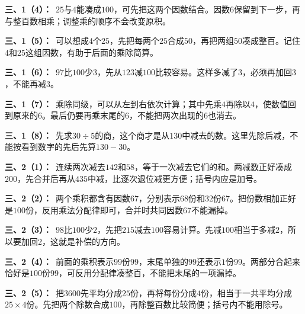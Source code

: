 \documentclass[multi=snippet,border=0pt]{standalone}
\newenvironment{snippet}[3]{\begin{minipage}{#1bp}\color{answerred}\fontsize{#2}{#3}\selectfont\raggedright}{\end{minipage}}
\begin{document}
\begin{snippet}{505}{11.5}{14}\textbf{三、1（4）：}\ \(25\)与\(4\)能凑成\(100\)，可先把这两个因数结合。因数\(6\)保留到下一步，再与整百数相乘；调整乘的顺序不会改变原积。\end{snippet}
\begin{snippet}{505}{11.5}{14}\textbf{三、1（5）：}\ 可以想成\(4\)个\(25\)，先把每两个\(25\)合成\(50\)，再把两组\(50\)凑成整百。记住\(4\)和\(25\)这组因数，有助于后面的乘除简算。\end{snippet}
\begin{snippet}{505}{11.5}{14}\textbf{三、1（6）：}\ \(97\)比\(100\)少\(3\)，先从\(123\)减\(100\)比较容易。这样多减了\(3\)，必须再加回\(3\)，不能再减\(3\)。\end{snippet}
\begin{snippet}{505}{11.5}{14}\textbf{三、1（7）：}\ 乘除同级，可以从左到右依次计算；其中先乘\(4\)再除以\(4\)，使数值回到原来的\(6\)。最后仍要再乘末尾的\(6\)，不能把两次出现的\(6\)也消去。\end{snippet}
\begin{snippet}{505}{11.5}{14}\textbf{三、1（8）：}\ 先求\(30\div5\)的商，这个商才是从\(130\)中减去的数。这里先除后减，不能按看到数字的先后先算\(130-30\)。\end{snippet}
\begin{snippet}{505}{11.5}{14}\textbf{三、2（1）：}\ 连续两次减去\(142\)和\(58\)，等于一次减去它们的和。两减数正好凑成\(200\)，先合并后再从\(435\)中减，比逐次退位减更方便；括号内应是加号。\end{snippet}
\begin{snippet}{505}{11.5}{14}\textbf{三、2（2）：}\ 两个乘积都含有因数\(67\)，分别表示\(68\)份和\(32\)份\(67\)。把份数相加正好是\(100\)份，反用乘法分配律即可，合并时共同因数\(67\)不能漏掉。\end{snippet}
\begin{snippet}{505}{11.5}{14}\textbf{三、2（3）：}\ \(98\)比\(100\)少\(2\)，先把\(215\)减去\(100\)容易计算。先减\(100\)相当于多减\(2\)，所以要加回\(2\)，这就是补偿的方向。\end{snippet}
\begin{snippet}{505}{11.5}{14}\textbf{三、2（4）：}\ 前面的乘积表示\(99\)份\(99\)，末尾单独的\(99\)还表示\(1\)份\(99\)。两部分合起来恰好是\(100\)份\(99\)，可反用分配律凑整百，不能把末尾的一项漏掉。\end{snippet}
\begin{snippet}{505}{11.5}{14}\textbf{三、2（5）：}\ 把\(3600\)先平均分成\(25\)份，再将每份分成\(4\)份，相当于一共平均分成\(25\times4\)份。先把两个除数合成\(100\)，再除整百数比较简便；括号内不能用除号。\end{snippet}
\end{document}
